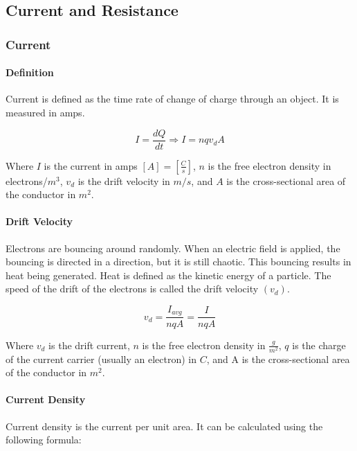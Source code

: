 \subsection{Current and Resistance}

\hrulefill

\subsubsection*{Current}

\paragraph*{Definition}
Current is defined as the time rate of change of charge through an object. It is measured in amps.

\begin{equation*}
    I=\frac{dQ}{dt} \Rightarrow I = nqv_dA
\end{equation*}

Where $I$ is the current in amps $[A] = [\frac{C}{s}]$, $n$ is the free electron density in electrons/$m^3$, 
$v_d$ is the drift velocity in $m/s$, and $A$ is the cross-sectional area of the conductor in $m^2$.


\paragraph*{Drift Velocity}
Electrons are bouncing around randomly. When an electric field is applied, the bouncing is directed 
in a direction, but it is still chaotic. This bouncing results in heat being generated. Heat is defined 
as the kinetic energy of a particle. The speed of the drift of the electrons is called the drift velocity $(v_d)$.

\begin{equation*}
    v_d = \frac{I_{avg}}{nqA} = \frac{I}{nqA}
\end{equation*}

Where $v_d$ is the drift current, $n$ is the free electron density in $\frac{g}{m^2}$, $q$ is the charge of the current carrier 
(usually an electron) in $C$, and A is the cross-sectional area of the conductor in $m^2$.


\paragraph*{Current Density}
Current density is the current per unit area. It can be calculated using the following formula:

